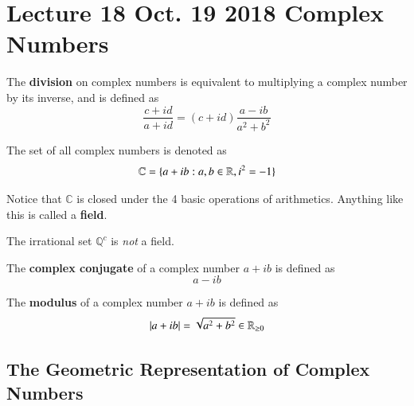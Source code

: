 \documentclass[10pt]{article}
\begin{document}
	\section{Lecture 18 Oct. 19 2018 Complex Numbers}
	\begin{definition}
		The \textbf{division} on complex numbers is equivalent to multiplying a complex number by its inverse, and is defined as 
		\[
			\frac{c+id}{a+id} = (c+id) \frac{a-ib}{a^2 + b^2}
		\]
	\end{definition}
	
	\begin{notation}
		The set of all complex numbers is denoted as 
		\[
			\mathbb{C} = \{ a + ib : a, b \in \mathbb{R}, i^2 = - 1\}
		\]
	\end{notation}
	\begin{remark}
		Notice that $\mathbb{C}$ is closed under the 4 basic operations of arithmetics. Anything like this is called a \textbf{field}.
	\end{remark}
	
	\begin{example}
		The irrational set $\mathbb{Q}^c$ is \emph{not} a field.
	\end{example}
	
	\begin{definition}
		The \textbf{complex conjugate} of a complex number $a + ib$ is defined as 
		\[
			a - ib
		\]
	\end{definition}
	
	\begin{definition}
		The \textbf{modulus} of a complex number $a + ib$ is defined as 
		\[
			|a + ib| = \sqrt{a^2 + b^2} \in \mathbb{R}_{\geq 0}
		\]
	\end{definition}
	
	\subsection{The Geometric Representation of Complex Numbers}
	
\end{document}
